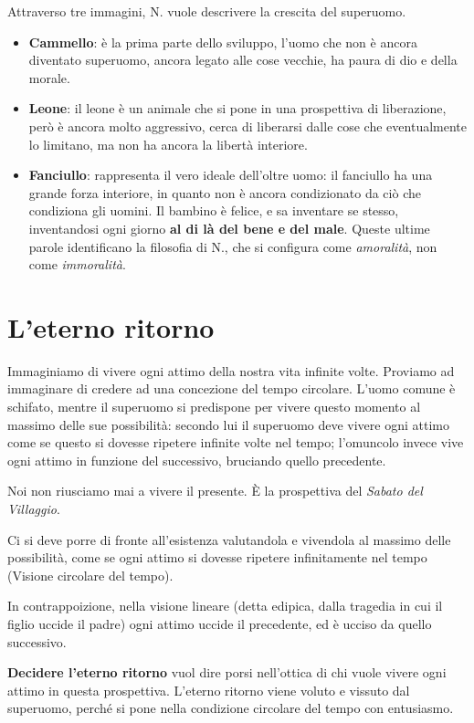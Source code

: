 \documentclass[a4paper, twoside, titlepage]{book}
\begin{document}
Attraverso tre immagini, N. vuole descrivere la crescita del superuomo.

\begin{itemize}
\item \textbf{Cammello}: è la prima parte dello sviluppo, l'uomo che non è ancora diventato superuomo, ancora legato alle cose vecchie, ha paura di dio e della morale.
\item \textbf{Leone}: il leone è un animale che si pone in una prospettiva di liberazione, però è ancora molto aggressivo, cerca di liberarsi dalle cose che eventualmente lo limitano, ma non ha ancora la libertà interiore.
\item \textbf{Fanciullo}: rappresenta il vero ideale dell'oltre uomo: il fanciullo ha una grande forza interiore, in quanto non è ancora condizionato da ciò che condiziona gli uomini. Il bambino è felice, e sa inventare se stesso, inventandosi ogni giorno \textbf{al di là del bene e del male}. Queste ultime parole identificano la filosofia di N., che si configura come \textit{amoralità}, non come \textit{immoralità}.
\end{itemize}

\section{L'eterno ritorno}

Immaginiamo di vivere ogni attimo della nostra vita infinite volte. Proviamo ad immaginare di credere ad una concezione del tempo circolare. 
L'uomo comune è schifato, mentre il superuomo si predispone per vivere questo momento al massimo delle sue possibilità: secondo lui il superuomo deve vivere ogni attimo come se questo si dovesse ripetere infinite volte nel tempo; l'omuncolo invece vive ogni attimo in funzione del successivo, bruciando quello precedente.

Noi non riusciamo mai a vivere il presente. È la prospettiva del \textit{Sabato del Villaggio}.

Ci si deve porre di fronte all'esistenza valutandola e vivendola al massimo delle possibilità, come se ogni attimo si dovesse ripetere infinitamente nel tempo (Visione circolare del tempo).

In contrappoizione, nella visione lineare (detta edipica, dalla tragedia in cui il figlio uccide il padre) ogni attimo uccide il precedente, ed è ucciso da quello successivo.

\textbf{Decidere l'eterno ritorno} vuol dire porsi nell'ottica di chi vuole vivere ogni attimo in questa prospettiva. L'eterno ritorno viene voluto e vissuto dal superuomo, perché si pone nella condizione circolare del tempo con entusiasmo.
\end{document}
